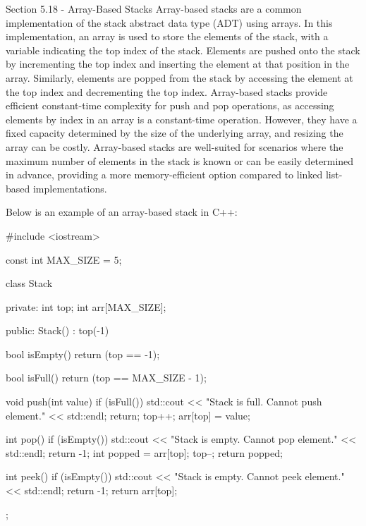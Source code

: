 \begin{notes}{Section 5.18 - Array-Based Stacks}
    Array-based stacks are a common implementation of the stack abstract data type (ADT) using arrays. In this implementation, an array is used to store the elements of the stack, with a variable indicating the top index of the stack. Elements are pushed onto the stack by incrementing the top index and inserting the element at that position in the array. Similarly, 
    elements are popped from the stack by accessing the element at the top index and decrementing the top index. Array-based stacks provide efficient constant-time complexity for push and pop operations, as accessing elements by index in an array is a constant-time operation. However, they have a fixed capacity determined by the size of the underlying array, and resizing 
    the array can be costly. Array-based stacks are well-suited for scenarios where the maximum number of elements in the stack is known or can be easily determined in advance, providing a more memory-efficient option compared to linked list-based implementations.
    
    \begin{highlight}
        Below is an example of an array-based stack in C++:
    
    \begin{code}[C++]
    #include <iostream>
    
    const int MAX_SIZE = 5;
    
    class Stack {
    private:
        int top;
        int arr[MAX_SIZE];
    
    public:
        Stack() : top(-1) {}
    
        bool isEmpty() {
            return (top == -1);
        }
    
        bool isFull() {
            return (top == MAX_SIZE - 1);
        }
    
        void push(int value) {
            if (isFull()) {
                std::cout << "Stack is full. Cannot push element." << std::endl;
                return;
            }
            top++;
            arr[top] = value;
        }
    
        int pop() {
            if (isEmpty()) {
                std::cout << "Stack is empty. Cannot pop element." << std::endl;
                return -1;
            }
            int popped = arr[top];
            top--;
            return popped;
        }
    
        int peek() {
            if (isEmpty()) {
                std::cout << "Stack is empty. Cannot peek element." << std::endl;
                return -1;
            }
            return arr[top];
        }
    };
    

\end{code}
\end{highlight}
\end{notes}
